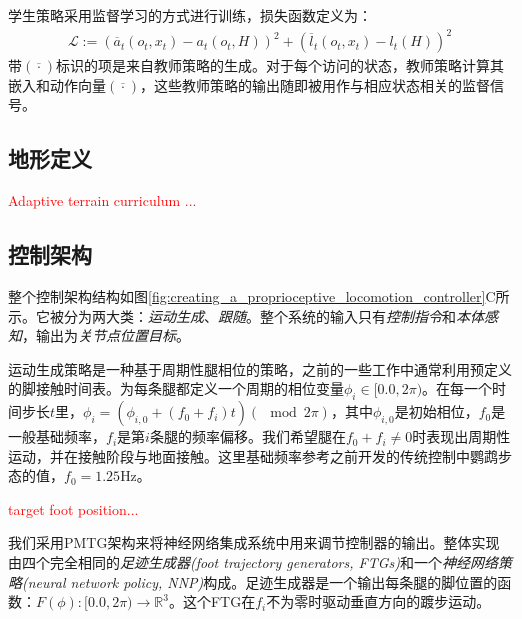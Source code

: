 学生策略采用监督学习的方式进行训练，损失函数定义为：
\begin{align}
    \mathcal{L}:=(\overline{a}_t(o_t,x_t)-a_t(o_t,H))^2+(\overline{l}_t(o_t, x_t)-l_t(H))^2
\end{align}
带$(\overline{\cdot})$标识的项是来自教师策略的生成。对于每个访问的状态，教师策略计算其嵌入和动作向量$(\overline{\cdot})$，这些教师策略的输出随即被用作与相应状态相关的监督信号。


\subsection[地形定义]{地形定义}
\textcolor{red}{Adaptive terrain curriculum ...}

\subsection[控制架构]{控制架构}

整个控制架构结构如图\ref{fig:creating_a_proprioceptive_locomotion_controller}C所示。它被分为两大类：\emph{运动生成}、\emph{跟随}。整个系统的输入只有\emph{控制指令}和\emph{本体感知}，输出为\emph{关节点位置目标}。

运动生成策略是一种基于周期性腿相位的策略，之前的一些工作中通常利用预定义的脚接触时间表\cite[p7]{Bellicoso_Jenelten_Gehring_Hutter_2018,Barasuol_Buchli_Semini_Frigerio_De_Pieri_Caldwell_2013}。为每条腿都定义一个周期的相位变量$\phi_i\in[0.0,2\pi)$。在每一个时间步长$t$里，$\phi_i = (\phi_{i,0}+(f_0+f_i)t)(\mod 2\pi)$，其中$\phi_{i,0}$是初始相位，$f_0$是一般基础频率，$f_i$是第$i$条腿的频率偏移。我们希望腿在$f_0+f_i\neq 0$时表现出周期性运动，并在接触阶段与地面接触。这里基础频率参考之前开发的传统控制\cite[p7]{Bellicoso_Jenelten_Gehring_Hutter_2018}中鹦鹉步态的值，$f_0=1.25$Hz。

\textcolor{red}{target foot position...}

我们采用PMTG架构来将神经网络集成系统中用来调节控制器的输出。整体实现由四个完全相同的\emph{足迹生成器(foot trajectory generators, FTGs)}和一个\emph{神经网络策略(neural network policy, NNP)}构成。足迹生成器是一个输出每条腿的脚位置的函数：$F(\phi):[0.0,2\pi)\to \mathbb{R}^3$。这个FTG在$f_i$不为零时驱动垂直方向的踱步运动。

